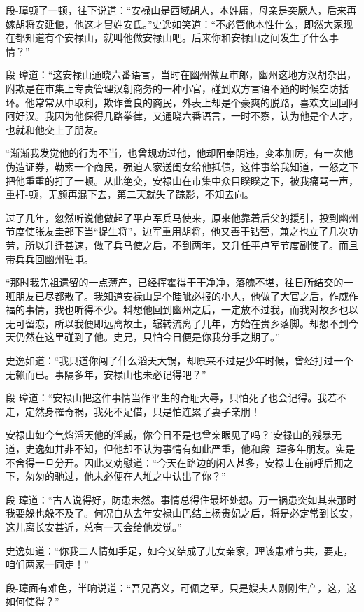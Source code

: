 \documentclass[12pt,oneside]{book}
\begin{document}
段-璋顿了一顿，往下说道：``安禄山是西域胡人，本姓庸，母亲是突厥人，后来再嫁胡将安延偃，他这才冒姓安氏。''史逸如笑道：``不必管他本性什么，即然大家现在都知道有个安禄山，就叫他做安禄山吧。后来你和安禄山之间发生了什么事情？''

段-璋道：``这安禄山通晓六番语言，当时在幽州做互市郎，幽州这地方汉胡杂出，附欺是在市集上专责管理汉朝商务的一种小官，碰到双方言语不通的时候空防括环。他常常从中取利，欺诈善良的商民，外表上却是个豪爽的脱路，喜欢文回回阿阿好汉。我因为他保得几路拳律，又通晓六番语言，一时不察，认为他是个人才，也就和他交上了朋友。

``渐渐我发觉他的行为不当，也曾规劝过他，他却阳奉阴违，变本加厉，有一次他伪造证券，勒索一个商民，强迫人家送闺女给他抵债，这件事给我知道，一怒之下把他重重的打了一顿。从此绝交，安禄山在市集中众目睽睽之下，被我痛骂一声，重打-顿，无颜再混下去，第二天就失了踪影，不知去向。

过了几年，忽然听说他做起了平卢军兵马使来，原来他靠着后父的援引，投到幽州节度使张友圭部下当``捉生将''，边军重用胡将，他又善于钻营，兼之也立了几次功劳，所以升迁甚速，做了兵马使之后，不到两年，又升任平卢军节度副使了。而且带兵兵回幽州驻屯。

``那时我先祖遗留的一点薄产，已经挥霍得干干净净，落魄不堪，往日所结交的一班朋友已尽都散了。我知道安禄山是个眭眦必报的小人，他做了大官之后，作威作福的事情，我也听得不少。料想他回到幽州之后，一定放不过我，而我对故乡也以无可留恋，所以我便即远离故土，辗转流离了几年，方始在贵乡落脚。却想不到今天仍然在这里碰到了他。史兄，只怕今日便是你我分手之期了。''

史逸如道：``我只道你闯了什么滔天大锅，却原来不过是少年时候，曾经打过一个无赖而已。事隔多年，安禄山也未必记得吧？''

段-璋道：``安禄山把这件事情当作平生的奇耻大辱，只怕死了也会记得。我若不走，定然身罹奇祸，我死不足借，只是怕连累了妻子亲朋！

安禄山如今气焰滔天他的淫威，你今日不是也曾亲眼见了吗？'安禄山的残暴无道，史逸如并非不知，但他却不认为事情有如此严重，他和段-
璋多年朋友。实是不舍得一旦分开。因此又劝慰道：``今天在路边的闲人甚多，安禄山在前呼后拥之下，匆匆的驰过，他未必便在人堆之中认出了你？''

段-璋道：``古人说得好，防患未然。事情总得住最坏处想。万一祸患突如其来那时我要躲也躲不及了。何况自从去年安禄山巴结上杨贵妃之后，将是必定常到长安，这儿离长安甚近，总有一天会给他发觉。''

史逸如道：``你我二人情如手足，如今又结成了儿女亲家，理该患难与共，要走，咱们两家一同走！''

段-璋面有难色，半晌说道：``吾兄高义，可佩之至。只是嫂夫人刚刚生产，这，这如何使得？''
\end{document}
